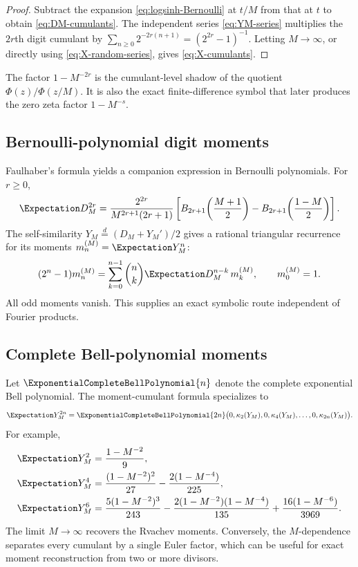 \documentclass[11pt,oneside]{article}
\theoremstyle{definition}
\theoremstyle{remark}
\begin{document}
\begin{proof}
Subtract the expansion \eqref{eq:logsinh-Bernoulli} at $t/M$ from that at $t$ to
obtain \eqref{eq:DM-cumulants}.  The independent series \eqref{eq:YM-series} multiplies
the $2r$th digit cumulant by
$\sum_{n\ge0}2^{-2r(n+1)}=(2^{2r}-1)^{-1}$.  Letting $M\to\infty$, or directly using
\eqref{eq:X-random-series}, gives \eqref{eq:X-cumulants}.
\end{proof}

The factor $1-M^{-2r}$ is the cumulant-level shadow of the quotient
$\Phi(z)/\Phi(z/M)$.  It is also the exact finite-difference symbol that later produces the
zero zeta factor $1-M^{-s}$.

\subsection{Bernoulli-polynomial digit moments}

Faulhaber's formula yields a companion expression in Bernoulli polynomials.  For $r\ge0$,
\begin{equation}
 \Expectation D_M^{2r}
 =\frac{2^{2r}}{M^{2r+1}(2r+1)}
 \left[
 B_{2r+1}\!\left(\frac{M+1}{2}\right)
 -B_{2r+1}\!\left(\frac{1-M}{2}\right)
 \right].
 \label{eq:DM-Bernoulli-polynomial}
\end{equation}
The self-similarity $Y_M\overset d=(D_M+Y_M')/2$ gives a rational triangular recurrence
for its moments $m_n^{(M)}=\Expectation Y_M^n$:
\begin{equation}
 (2^n-1)m_n^{(M)}
 =\sum_{k=0}^{n-1}\binom nk
 \Expectation D_M^{n-k}\,m_k^{(M)},
 \qquad m_0^{(M)}=1.
 \label{eq:moment-recurrence}
\end{equation}
All odd moments vanish.  This supplies an exact symbolic route independent of Fourier
products.

\subsection{Complete Bell-polynomial moments}

Let $\ExponentialCompleteBellPolynomial{n}$ denote the complete exponential Bell polynomial.  The moment-cumulant
formula specializes to
\begin{equation}
 \Expectation Y_M^{2n}
 =\ExponentialCompleteBellPolynomial{2n}\bigl(0,\kappa_2(Y_M),0,\kappa_4(Y_M),\ldots,
 0,\kappa_{2n}(Y_M)\bigr).
 \label{eq:Bell-moments}
\end{equation}
For example,
\begin{align}
 \Expectation Y_M^2
 &=\frac{1-M^{-2}}9,
 \label{eq:moment2}\\
 \Expectation Y_M^4
 &=\frac{(1-M^{-2})^2}{27}
   -\frac{2(1-M^{-4})}{225},
 \label{eq:moment4}\\
 \Expectation Y_M^6
 &=\frac{5(1-M^{-2})^3}{243}
   -\frac{2(1-M^{-2})(1-M^{-4})}{135}
   +\frac{16(1-M^{-6})}{3969}.
 \label{eq:moment6}
\end{align}
The limit $M\to\infty$ recovers the Rvachev moments.  Conversely, the $M$-dependence
separates every cumulant by a single Euler factor, which can be useful for exact moment
reconstruction from two or more divisors.
\end{document}
